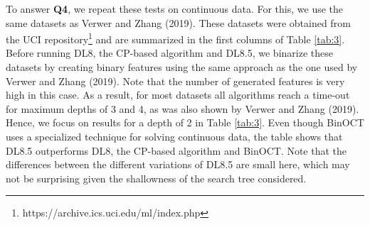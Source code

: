 To answer \textbf{Q4}, we repeat these tests on continuous data. For this, we use the same datasets as Verwer and Zhang (2019). These datasets were obtained from the UCI repository\footnote{https://archive.ics.uci.edu/ml/index.php} and are summarized in the first columns of Table \ref{tab:3}. Before running DL8, the CP-based algorithm and DL8.5, we binarize these datasets by creating binary features using the same approach as the one used by Verwer and Zhang (2019). Note that the number of generated features is very high in this case. As a result, for most datasets all algorithms reach a time-out for maximum depths of 3 and 4, as was also shown by Verwer and Zhang (2019). Hence, we focus on results for a depth of 2 in Table \ref{tab:3}. Even though BinOCT uses a specialized technique for solving continuous data, the table shows that DL8.5 outperforms DL8, the CP-based algorithm and BinOCT. Note that the differences between the different variations of DL8.5 are small here, which may not be surprising given the shallowness of the search tree considered.

